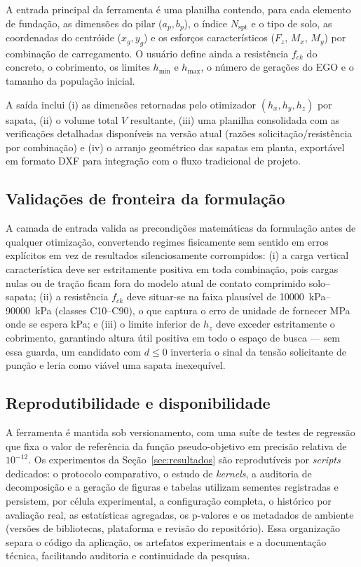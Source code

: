 A entrada principal da ferramenta é uma planilha contendo, para cada elemento de fundação, as dimensões do pilar ($a_p, b_p$), o índice $N_{\mathrm{spt}}$ e o tipo de solo, as coordenadas do centróide ($x_g, y_g$) e os esforços característicos ($F_z$, $M_x$, $M_y$) por combinação de carregamento. O usuário define ainda a resistência $f_{ck}$ do concreto, o cobrimento, os limites $h_{\min}$ e $h_{\max}$, o número de gerações do EGO e o tamanho da população inicial.

A saída inclui (i) as dimensões retornadas pelo otimizador $(h_x, h_y, h_z)$ por sapata, (ii) o volume total $V$ resultante, (iii) uma planilha consolidada com as verificações detalhadas disponíveis na versão atual (razões solicitação/resistência por combinação) e (iv) o arranjo geométrico das sapatas em planta, exportável em formato DXF para integração com o fluxo tradicional de projeto.

\subsection{Validações de fronteira da formulação}
\label{sec:impl_validacoes}

A camada de entrada valida as precondições matemáticas da formulação antes de qualquer otimização, convertendo regimes fisicamente sem sentido em erros explícitos em vez de resultados silenciosamente corrompidos: (i) a carga vertical característica deve ser estritamente positiva em toda combinação, pois cargas nulas ou de tração ficam fora do modelo atual de contato comprimido solo--sapata; (ii) a resistência $f_{ck}$ deve situar-se na faixa plausível de \SIrange{10000}{90000}{\kilo\pascal} (classes C10--C90), o que captura o erro de unidade de fornecer \si{\mega\pascal} onde se espera \si{\kilo\pascal}; e (iii) o limite inferior de $h_z$ deve exceder estritamente o cobrimento, garantindo altura útil positiva em todo o espaço de busca — sem essa guarda, um candidato com $d \le 0$ inverteria o sinal da tensão solicitante de punção e leria como viável uma sapata inexequível.

\subsection{Reprodutibilidade e disponibilidade}
\label{sec:impl_reprod}

A ferramenta \fundaai{} é mantida sob versionamento, com uma suíte de testes de regressão que fixa o valor de referência da função pseudo-objetivo em precisão relativa de $10^{-12}$. Os experimentos da Seção~\ref{sec:resultados} são reprodutíveis por \textit{scripts} dedicados: o protocolo comparativo, o estudo de \textit{kernels}, a auditoria de decomposição e a geração de figuras e tabelas utilizam sementes registradas e persistem, por célula experimental, a configuração completa, o histórico por avaliação real, as estatísticas agregadas, os p-valores e os metadados de ambiente (versões de bibliotecas, plataforma e revisão do repositório). Essa organização separa o código da aplicação, os artefatos experimentais e a documentação técnica, facilitando auditoria e continuidade da pesquisa.

